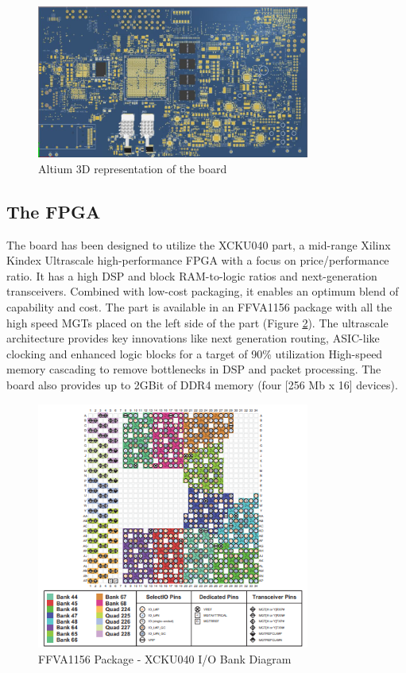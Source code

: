 \documentclass[a4paper]{PoS}
\begin{document}
\begin{figure}[h]
\centering
\includegraphics[width=0.8\textwidth]{board_3D_altium.png}
\caption{Altium 3D representation of the board}
\label{fig1}
\end{figure}



\subsection{The FPGA}
The board has been designed to utilize the XCKU040 part, a  mid-range Xilinx Kindex Ultrascale high-performance FPGA with a focus on price/performance ratio. It has a high DSP and block RAM-to-logic ratios and next-generation transceivers. Combined with low-cost packaging, it enables an optimum blend of capability and cost. The part is available in an FFVA1156 package with all the high speed MGTs  placed on the left side of the part (Figure \ref{xcku040}). The ultrascale architecture provides key innovations like next generation routing, ASIC-like clocking and enhanced logic blocks for a target of 90\% utilization High-speed memory cascading to remove bottlenecks in DSP and packet processing.
The board also provides up to 2GBit of DDR4 memory (four [256 Mb x 16] devices).

\begin{figure}[h]
\centering
\includegraphics[width=0.8\textwidth]{xcku040_pinout.png}
\caption{FFVA1156 Package - XCKU040 I/O Bank Diagram}
\label{xcku040}
\end{figure}
\end{document}
